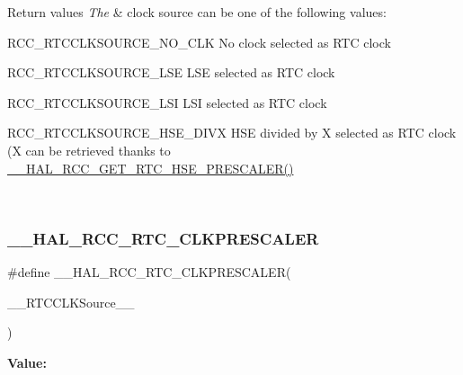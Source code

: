 \begin{DoxyRetVals}{Return values}
{\em The} & clock source can be one of the following values\+: \begin{DoxyItemize}
\item R\+C\+C\+\_\+\+R\+T\+C\+C\+L\+K\+S\+O\+U\+R\+C\+E\+\_\+\+N\+O\+\_\+\+C\+LK No clock selected as R\+TC clock \item R\+C\+C\+\_\+\+R\+T\+C\+C\+L\+K\+S\+O\+U\+R\+C\+E\+\_\+\+L\+SE L\+SE selected as R\+TC clock \item R\+C\+C\+\_\+\+R\+T\+C\+C\+L\+K\+S\+O\+U\+R\+C\+E\+\_\+\+L\+SI L\+SI selected as R\+TC clock \item R\+C\+C\+\_\+\+R\+T\+C\+C\+L\+K\+S\+O\+U\+R\+C\+E\+\_\+\+H\+S\+E\+\_\+\+D\+I\+VX H\+SE divided by X selected as R\+TC clock (X can be retrieved thanks to \mbox{\hyperlink{group___r_c_c___internal___r_t_c___clock___configuration_ga85dc62f0fcb14981c47d7f7da25e26d6}{\+\_\+\+\_\+\+H\+A\+L\+\_\+\+R\+C\+C\+\_\+\+G\+E\+T\+\_\+\+R\+T\+C\+\_\+\+H\+S\+E\+\_\+\+P\+R\+E\+S\+C\+A\+L\+E\+R()}} \end{DoxyItemize}
\\
\hline
\end{DoxyRetVals}
\mbox{\label{group___r_c_c___internal___r_t_c___clock___configuration_ga7e10e306e7d9f3cd59d30dcb2c9cf61d}} 
\subsubsection{\texorpdfstring{\_\_HAL\_RCC\_RTC\_CLKPRESCALER}{\_\_HAL\_RCC\_RTC\_CLKPRESCALER}}
{\footnotesize\ttfamily \#define \+\_\+\+\_\+\+H\+A\+L\+\_\+\+R\+C\+C\+\_\+\+R\+T\+C\+\_\+\+C\+L\+K\+P\+R\+E\+S\+C\+A\+L\+ER(\begin{DoxyParamCaption}\item[{}]{\+\_\+\+\_\+\+R\+T\+C\+C\+L\+K\+Source\+\_\+\+\_\+ }\end{DoxyParamCaption})}

{\bfseries Value\+:}
\begin{DoxyCode}{0}

\end{DoxyCode}


